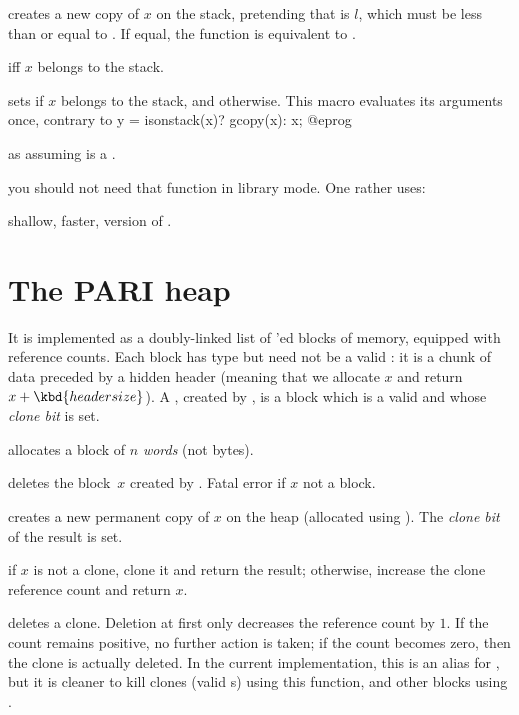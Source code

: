  creates a new copy of $x$
on the stack, pretending that  is $l$, which must be less than or
equal to . If equal, the function is equivalent to .

  iff $x$ belongs to the stack.

 sets  if
$x$ belongs to the stack, and  otherwise. This macro evaluates
its arguments once, contrary to
\bprog
  y = isonstack(x)? gcopy(x): x;
@eprog

 as  assuming 
is a .


 you should not need that function in library mode.
One rather uses:

 shallow, faster, version of .

\section{The PARI heap}

It is implemented as a doubly-linked list of 'ed blocks of
memory, equipped with reference counts. Each block has type  but need
not be a valid : it is a chunk of data preceded by a hidden header
(meaning that we allocate $x$ and return $x + \kbd{header size}$). A
, created by , is a block which is a valid 
and whose \emph{clone bit} is set.


 allocates a block of $n$ \emph{words} (not bytes).

 deletes the block~$x$ created by .
Fatal error if $x$ not a block.

 creates a new permanent copy of $x$ on the heap
(allocated using ). The \emph{clone bit} of the result is set.

 if $x$ is not a clone, clone it and return the
result; otherwise, increase the clone reference count and return $x$.

 deletes a clone. Deletion at first only decreases
the reference count by $1$. If the count remains positive, no further action is
taken; if the count becomes zero, then the clone is actually deleted. In the
current implementation, this is an alias for , but it is cleaner
to kill clones (valid s) using this function, and other blocks using
.

